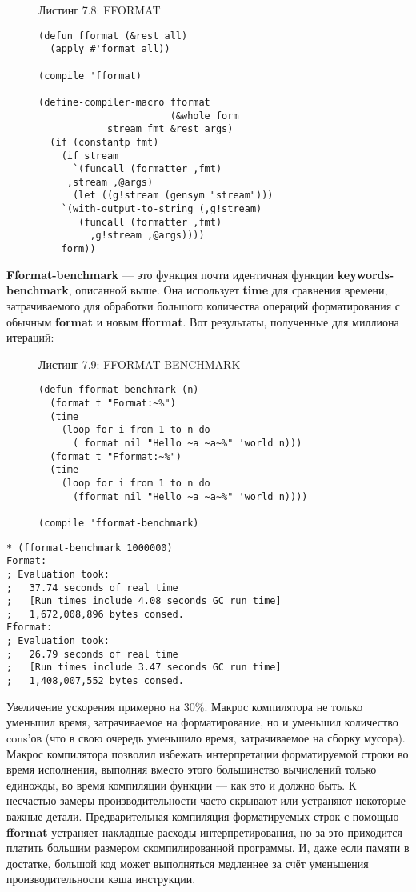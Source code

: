 \begin{figure}Листинг 7.8: FFORMAT\label{listing_7.8}
\listbegin
\begin{verbatim}
(defun fformat (&rest all)
  (apply #'format all))

(compile 'fformat)

(define-compiler-macro fformat
                       (&whole form
			stream fmt &rest args)
  (if (constantp fmt)
    (if stream
      `(funcall (formatter ,fmt)
	 ,stream ,@args)
      (let ((g!stream (gensym "stream")))
	`(with-output-to-string (,g!stream)
	   (funcall (formatter ,fmt)
	     ,g!stream ,@args))))
    form))
\end{verbatim}
\listend
\end{figure}

\textbf{Fformat-benchmark} --- это функция почти идентичная функции \textbf{key\-words-benchmark}, описанной выше. Она использует \textbf{time} для сравнения времени, затрачиваемого для обработки большого количества операций форматирования с обычным \textbf{format} и новым \textbf{fformat}. Вот результаты, полученные для миллиона итераций:

\begin{figure}Листинг 7.9: FFORMAT-BENCHMARK\label{listing_7.9}
\listbegin
\begin{verbatim}
(defun fformat-benchmark (n)
  (format t "Format:~%")
  (time
    (loop for i from 1 to n do
      ( format nil "Hello ~a ~a~%" 'world n)))
  (format t "Fformat:~%")
  (time
    (loop for i from 1 to n do
      (fformat nil "Hello ~a ~a~%" 'world n))))

(compile 'fformat-benchmark)
\end{verbatim}
\listend
\end{figure}

\begin{verbatim}
* (fformat-benchmark 1000000)
Format:
; Evaluation took:
;   37.74 seconds of real time
;   [Run times include 4.08 seconds GC run time]
;   1,672,008,896 bytes consed.
Fformat:
; Evaluation took:
;   26.79 seconds of real time
;   [Run times include 3.47 seconds GC run time]
;   1,408,007,552 bytes consed.
\end{verbatim}

Увеличение ускорения примерно на 30\%. Макрос компилятора не только уменьшил время, затрачиваемое на форматирование, но и уменьшил количество cons'ов (что в свою очередь уменьшило время, затрачиваемое на сборку мусора). Макрос компилятора позволил избежать интерпретации форматируемой строки во время исполнения, выполняя вместо этого большинство вычислений только единожды, во время компиляции функции --- как это и должно быть. К несчастью замеры производительности часто скрывают или устраняют некоторые важные детали. Предварительная компиляция форматируемых строк с помощью \textbf{fformat} устраняет накладные расходы интерпретирования, но за это приходится платить большим размером скомпилированной программы. И, даже если памяти в достатке, большой код может выполняться медленнее за счёт уменьшения производительности кэша инструкции.

